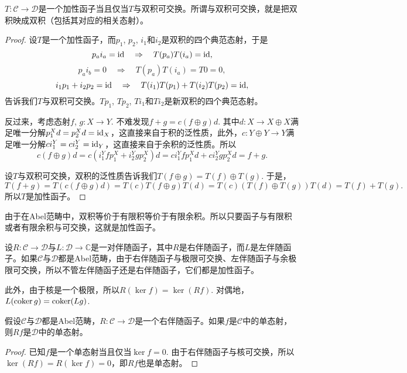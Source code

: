 \begin{pro}
$T:\mathcal{C}\to \mathcal{D}$是一个加性函子当且仅当$T$与双积可交换。所谓与双积可交换，就是把双积映成双积（包括其对应的相关态射）。
\end{pro}

\begin{proof}
设$T$是一个加性函子，而$p_1$, $p_2$, $i_1$和$i_2$是双积的四个典范态射，于是
\[
	p_ai_a = \operatorname{id} \quad \Rightarrow \quad T(p_a)T(i_a) = \operatorname{id},
\]
\[
	p_ai_b = 0 \quad \Rightarrow \quad T(p_a)T(i_a) = T0=0,
\]
\[
	i_1p_1+i_2p_2 = \operatorname{id} \quad \Rightarrow \quad T(i_1)T(p_1)+T(i_2)T(p_2) = \operatorname{id},
\]
告诉我们$T$与双积可交换。$Tp_1$, $Tp_2$, $Ti_1$和$Ti_2$是新双积的四个典范态射。

反过来，考虑态射$f$, $g:X\to Y$. 不难发现$f+g=c(f\oplus g)d$. 其中$d:X\to X\oplus X$满足唯一分解$p^X_1d=p^X_2d=\operatorname{id}_X$，这直接来自于积的泛性质，此外，$c:Y\oplus Y\to Y$满足唯一分解$ci^Y_1=ci^Y_2=\operatorname{id}_Y$，这直接来自于余积的泛性质。所以
\[
	c(f\oplus g)d=c(i_1^Y f p_1^X+i_2^Y g p_2^X)d=c i_1^Y f p_1^X d+ ci_2^Y g p_2^Xd=f+g.
\]

设$T$与双积可交换，双积的泛性质告诉我们$T(f\oplus g)=T(f)\oplus T(g)$. 于是，
\[
	T(f+g)=T(c(f\oplus g)d)=T(c)T(f\oplus g)T(d)=T(c)(T(f)\oplus T(g))T(d)=T(f)+T(g).
\]
所以$T$是加性函子。
\end{proof}

由于在Abel范畴中，双积等价于有限积等价于有限余积。所以只要函子与有限积或者有限余积与可交换，这就是加性函子。

\begin{para}
设$R:\mathcal{C}\to \mathcal{D}$与$L:\mathcal{D}\to \mathbb{C}$是一对伴随函子，其中$R$是右伴随函子，而$L$是左伴随函子。如果$\mathcal{C}$与$\mathcal{D}$都是Abel范畴，由于右伴随函子与极限可交换、左伴随函子与余极限可交换，所以不管左伴随函子还是右伴随函子，它们都是加性函子。

此外，由于核是一个极限，所以$R(\ker f)= \ker(Rf)$. 对偶地，$L(\operatorname{coker} g)= \operatorname{coker}(Lg)$.
\end{para}

\begin{lem}
假设$\mathcal{C}$与$\mathcal{D}$都是Abel范畴，$R:\mathcal{C}\to \mathcal{D}$是一个右伴随函子。如果$f$是$\mathcal{C}$中的单态射，则$Rf$是$\mathcal{D}$中的单态射。
\end{lem}

\begin{proof}
已知$f$是一个单态射当且仅当$\ker f=0$. 由于右伴随函子与核可交换，所以$\ker(Rf)= R(\ker f)=0$，即$Rf$也是单态射。
\end{proof}


